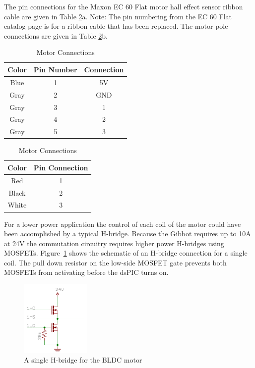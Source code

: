 \documentclass{article}
\begin{document}
The pin connections for the Maxon EC 60 Flat motor hall effect sensor ribbon cable  are given in Table \ref{tab:motpin1}a. Note: The pin numbering from the EC 60 Flat catalog page is for a ribbon cable that has been replaced. The motor pole connections are given in Table \ref{tab:motpin1}b.

\begin{table}[h!]
	\centering
	\caption{Motor Connections}
	\begin{subtable}[t]{0.4\textwidth}	
		\centering
		\begin{tabular}{| c | c | c |}
			\hline
			\textbf{Color} & \textbf{Pin Number} & \textbf{Connection} \\ \hline
			Blue & 1 & 5V \\ \hline
			Gray & 2 & GND \\ \hline
			Gray & 3 & 1 \\ \hline
			Gray & 4 & 2 \\ \hline
			Gray & 5 & 3 \\ \hline
		\end{tabular}
	\end{subtable}
	\begin{subtable}[t]{0.4\textwidth}
		\centering
		\begin{tabular}{| c | c |}
			\hline
			\textbf{Color} & \textbf{Pin Connection} \\ \hline
			Red & 1  \\ \hline
			Black & 2 \\ \hline
			White & 3 \\ \hline
		\end{tabular}
	\end{subtable}
	\label{tab:motpin1}
\end{table}

For a lower power application the control of each coil of the motor could have been accomplished by a typical H-bridge. Because the Gibbot requires up to 10A at 24V the commutation circuitry requires higher power H-bridges using MOSFETs.  Figure~\ref{fig:hbridge} shows the schematic of an H-bridge connection for a single coil. The pull down resistor on the low-side MOSFET gate prevents both MOSFETs from activating before the dsPIC turns on. 

\begin{figure}[h]
	\centering
	\includegraphics[width=0.3\textwidth]{hbridge}
	\caption{A single H-bridge for the BLDC motor}
	\label{fig:hbridge}
\end{figure}
\end{document}
